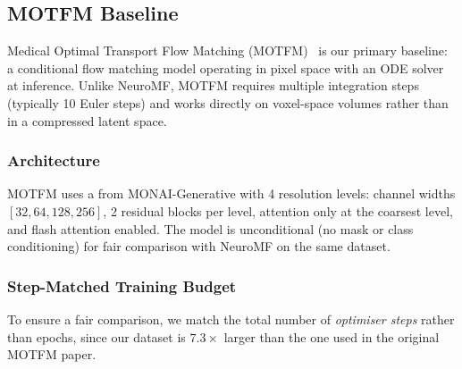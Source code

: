 \subsection{MOTFM Baseline}
\label{sec:motfm_baseline}

Medical Optimal Transport Flow Matching (MOTFM)~\cite{motfm} is our
primary baseline: a conditional flow matching model operating in pixel space
with an ODE solver at inference.  Unlike NeuroMF, MOTFM requires multiple
integration steps (typically 10 Euler steps) and works directly on voxel-space
volumes rather than in a compressed latent space.

\subsubsection{Architecture}

MOTFM uses a  from MONAI-Generative with 4 resolution
levels: channel widths $[32, 64, 128, 256]$, 2 residual blocks per level,
attention only at the coarsest level, and flash attention enabled.  The model is
unconditional (no mask or class conditioning) for fair comparison with NeuroMF
on the same dataset.

\subsubsection{Step-Matched Training Budget}

To ensure a fair comparison, we match the total number of \emph{optimiser steps}
rather than epochs, since our dataset is $7.3\times$ larger than the one used in
the original MOTFM paper.

